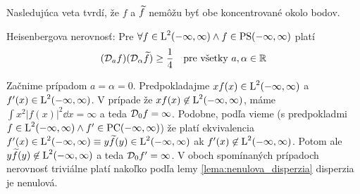 Nasledujúca veta tvrdí, že $f$ a $\widetilde{f}$ nemôžu byť obe
koncentrované okolo bodov.

\begin{veta}
    Heisenbergova nerovnosť:
    Pre $\forall f\in \mbox{L}^2(-\infty,\infty) \wedge f\in \mbox{PS}(-\infty,\infty)$ platí
    \begin{equation}
        (\mathcal{D}_{a}f)(\mathcal{D}_{\alpha}\widetilde{f}) \ge \frac{1}{4}
        \quad \text{pre všetky } a,\alpha \in {\mathbb R}
        \label{eq:hei_ineq}
    \end{equation}
\end{veta}
\begin{dokaz}
    Začnime prípadom $a=\alpha=0$.
    Predpokladajme $x f(x) \in \mbox{L}^2(-\infty,\infty)$ a $f'(x)\in \mbox{L}^2(-\infty,\infty)$.
    V prípade že $x f(x) \not\in\mbox{L}^2(-\infty,\infty)$, máme
    $\int x^2 |f(x)|^2 \dd x = \infty$ a teda $\mathcal{D}_{0}f=\infty$.
    Podobne, podľa \todo{} vieme (s predpokladmi $f \in \mbox{L}^2(-\infty,\infty) \wedge
    f' \in \mbox{PC}(-\infty,\infty)$) že platí ekvivalencia $f'(x)\in\mbox{L}^2(-\infty,\infty) \equiv
    y\widetilde{f}(y)\in\mbox{L}^2(-\infty,\infty)$ ak $f'(x)\not\in\mbox{L}^2(-\infty,\infty)$. Potom ale 
    $y\widetilde{f}(y) \not\in\mbox{L}^2(-\infty,\infty)$ a teda $\mathcal{D}_{0}f'=\infty$.
    V oboch spomínaných prípadoch nerovnosť triviálne platí nakoľko
    podľa lemy \ref{lema:nenulova_disperzia} disperzia je nenulová.


\end{dokaz}
